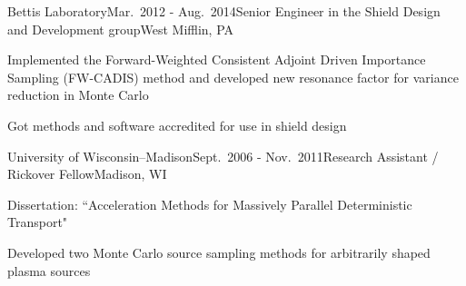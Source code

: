 
\begin{rSubsection}{Bettis Laboratory}{Mar.\ 2012 - Aug.\ 2014}{Senior Engineer in the Shield Design and Development group}{West Mifflin, PA}
\item Implemented the Forward-Weighted Consistent Adjoint Driven Importance Sampling (FW-CADIS) method and developed 
new resonance factor for variance reduction in Monte Carlo
\item Got methods and software accredited for use in shield design
\end{rSubsection}


\begin{rSubsection}{University of Wisconsin--Madison}{Sept.\ 2006 - Nov.\ 2011}{Research Assistant / Rickover Fellow}{Madison, WI}
\item Dissertation: ``Acceleration Methods for Massively Parallel Deterministic Transport"%
\item Developed two Monte Carlo source sampling methods for arbitrarily shaped plasma sources%
\end{rSubsection}



